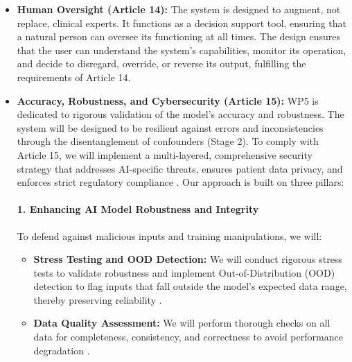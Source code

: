 \documentclass[11pt, a4paper]{article}
\begin{document}
\begin{itemize}
    \item \textbf{Human Oversight (Article 14):} The system is designed to augment, not replace, clinical experts. It functions as a decision support tool, ensuring that a natural person can oversee its functioning at all times. The design ensures that the user can understand the system's capabilities, monitor its operation, and decide to disregard, override, or reverse its output, fulfilling the requirements of Article 14.

    \item \textbf{Accuracy, Robustness, and Cybersecurity (Article 15):} WP5 is dedicated to rigorous validation of the model's accuracy and robustness. The system will be designed to be resilient against errors and inconsistencies through the disentanglement of confounders (Stage 2). To comply with Article 15, we will implement a multi-layered, comprehensive security strategy that addresses AI-specific threats, ensures patient data privacy, and enforces strict regulatory compliance \cite{AlAttar2023,AlkanZakariyya2025}. Our approach is built on three pillars:

\paragraph{1. Enhancing AI Model Robustness and Integrity}
To defend against malicious inputs and training manipulations, we will:
\begin{itemize}
    \item \textbf{Stress Testing and OOD Detection:} We will conduct rigorous stress tests to validate robustness and implement Out-of-Distribution (OOD) detection to flag inputs that fall outside the model's expected data range, thereby preserving reliability \cite{KhadkaEpiphaniou2025}.
    \item \textbf{Data Quality Assessment:} We will perform thorough checks on all data for completeness, consistency, and correctness to avoid performance degradation \cite{GarcaGmezBlanesSelva2023}.
\end{itemize}


\end{itemize}
\end{document}
